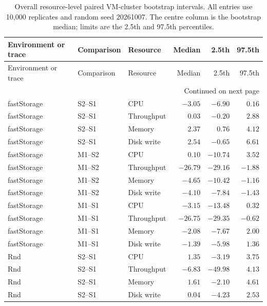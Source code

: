 \begin{longtable}{@{}lllrrr@{}}
  \caption{Overall resource-level paired VM-cluster bootstrap intervals. All
  entries use 10,000 replicates and random seed 20261007. The centre column is
  the bootstrap median; limits are the 2.5th and 97.5th percentiles.}
  \label{tab:overall-bootstrap-intervals}\\
  \toprule
  Environment or trace & Comparison & Resource & Median & 2.5th & 97.5th \\
  \midrule
  \endfirsthead
  \toprule
  Environment or trace & Comparison & Resource & Median & 2.5th & 97.5th \\
  \midrule
  \endhead
  \midrule
  \multicolumn{6}{r}{Continued on next page}\\
  \endfoot
  \bottomrule
  \endlastfoot
  fastStorage & S2--S1 & CPU & $-3.05$ & $-6.90$ & $ 0.16$ \\
  fastStorage & S2--S1 & Throughput & $ 0.03$ & $-0.20$ & $ 2.88$ \\
  fastStorage & S2--S1 & Memory & $ 2.37$ & $ 0.76$ & $ 4.12$ \\
  fastStorage & S2--S1 & Disk write & $ 2.54$ & $-0.65$ & $ 6.61$ \\
  fastStorage & M1--S2 & CPU & $ 0.10$ & $-10.74$ & $ 3.52$ \\
  fastStorage & M1--S2 & Throughput & $-26.79$ & $-29.16$ & $-1.88$ \\
  fastStorage & M1--S2 & Memory & $-4.65$ & $-10.42$ & $-1.16$ \\
  fastStorage & M1--S2 & Disk write & $-4.10$ & $-7.84$ & $-1.43$ \\
  fastStorage & M1--S1 & CPU & $-3.15$ & $-13.48$ & $ 0.32$ \\
  fastStorage & M1--S1 & Throughput & $-26.75$ & $-29.35$ & $-0.62$ \\
  fastStorage & M1--S1 & Memory & $-2.08$ & $-7.67$ & $ 2.00$ \\
  fastStorage & M1--S1 & Disk write & $-1.39$ & $-5.98$ & $ 1.36$ \\
  Rnd & S2--S1 & CPU & $ 1.35$ & $-3.19$ & $ 3.75$ \\
  Rnd & S2--S1 & Throughput & $-6.83$ & $-49.98$ & $ 4.13$ \\
  Rnd & S2--S1 & Memory & $ 1.61$ & $-2.10$ & $ 4.61$ \\
  Rnd & S2--S1 & Disk write & $ 0.04$ & $-4.23$ & $ 2.53$ \\

\end{longtable}
